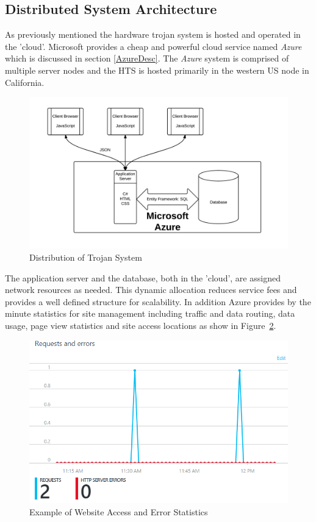 \subsection{Distributed System Architecture} \label{Architecture}
As previously mentioned the hardware trojan system is hosted and operated in the 'cloud'. Microsoft provides a cheap and powerful cloud service named \textit{Azure} which is discussed in section \ref{AzureDesc}. The \textit{Azure} system is comprised of multiple server nodes and the HTS is hosted primarily in the western US node in California. 
\begin{figure}
	\centering
	\includegraphics[width=0.9\linewidth]{figures/TrojanDistribution}
	\caption[Distribution of Trojan System]{Distribution of Trojan System}
	\label{fig:TrojanDistribution}
\end{figure}
The application server and the database, both in the 'cloud', are assigned network resources as needed. This dynamic allocation reduces service fees and provides a well defined structure for scalability. In addition Azure provides by the minute statistics for site management including traffic and data routing, data usage, page view statistics and site access locations as show in Figure~\ref{fig:azureReport}.
\begin{figure}
	\centering
	\includegraphics[width=.9\linewidth]{figures/azureReport}
	\caption[Example of Website Access and Error Statistics]{Example of Website Access and Error Statistics}
	\label{fig:azureReport}
\end{figure}
